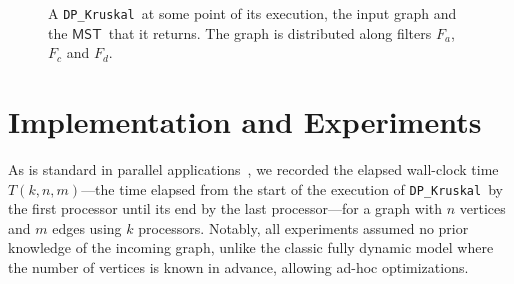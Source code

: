 \documentclass[runningheads,UKenglish]{llncs}
\newcommand{\mst}{$\mathsf{MST}$}
\newcommand{\DPmst}{\texttt{DP\_{Kruskal}}}
\begin{document}
\begin{figure}[H]
\begin{subfigure}[b]{0.5\textwidth}
{
    }
    \end{subfigure}
    \begin{subfigure}[b]{0.20\textwidth}
    \centering
    \end{subfigure}
    \caption{\label{fig:dp_example} A \DPmst\ at some point of its execution, the input graph and the \mst\ that it returns. The graph is distributed along filters $F_a$, $F_c$ and $F_d$.} 
\end{figure}
%
\vspace{-3em}
\section{Implementation and Experiments}
\label{sec:experiments}
%
As is standard in parallel applications~\cite{bader2002algorithm}, we recorded the elapsed
wall-clock time $T(k,n,m)$—the time elapsed from the start of the execution of \DPmst\ by the first processor until its end by the last
processor—for a graph with $n$ vertices and $m$ edges using
$k$ processors. Notably, all experiments assumed no prior knowledge of the incoming graph, unlike the classic
fully dynamic model where the number of vertices is known in advance, allowing ad-hoc optimizations. 
\end{document}
